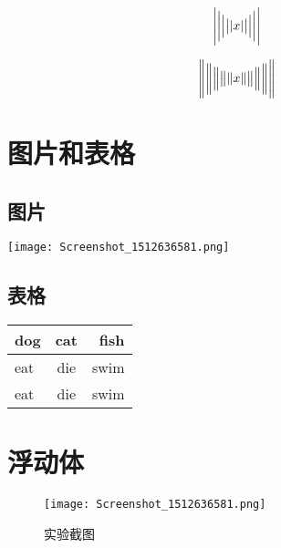 \documentclass[UTF8]{ctexart}
\begin{document}
  \[ \Biggl\lvert\biggl\lvert\Bigl\lvert\bigl\lvert\lvert x
  \rvert\bigr\rvert\Bigr\rvert\biggr\rvert\Biggr\rvert \]

  \[ \Biggl\lVert\biggl\lVert\Bigl\lVert\bigl\lVert\lVert x
  \rVert\bigr\rVert\Bigr\rVert\biggr\rVert\Biggr\rVert \]


\section{图片和表格}
  \subsection{图片}
  \texttt{[image: Screenshot\_1512636581.png]}
  \subsection{表格}
  \begin{tabular}{| l | c | r |}   %
    \hline
    dog & cat & fish \\
    \hline
    eat & die & swim \\
    \hline
    eat & die & swim \\
    \hline
  \end{tabular}


\section{浮动体}
\begin{figure}[htbp]
\centering   %
\texttt{[image: Screenshot\_1512636581.png]}   
\caption{实验截图}  %
\label{fig:myphoto}  %
\end{figure}
\end{document}
